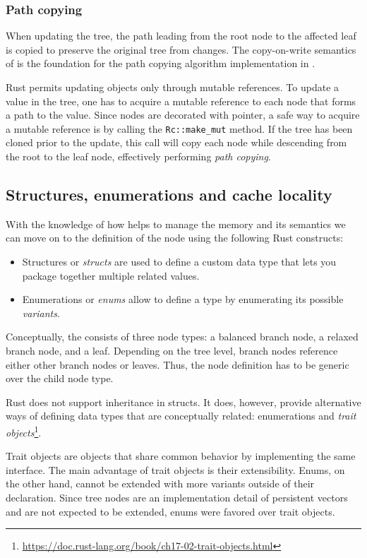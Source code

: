 \subsubsection*{Path copying}
When updating the tree, the path leading from the root node to the affected leaf is copied to preserve the original tree from changes. The copy-on-write semantics of \rc{} is the foundation for the path copying algorithm implementation in \rrbtree{}.

Rust permits updating objects only through mutable references. To update a value in the tree, one has to acquire a mutable reference to each node that forms a path to the value. Since nodes are decorated with \rc{} pointer, a safe way to acquire a mutable reference is by calling the \texttt{Rc::make_mut} method. If the tree has been cloned prior to the update, this call will copy each node while descending from the root to the leaf node, effectively performing \emph{path copying}.

\subsection{Structures, enumerations and cache locality}
With the knowledge of how \rc{} helps to manage the memory and its semantics we can move on to the definition of the \rrbtree{} node using the following Rust constructs:
\begin{itemize}
    \item Structures or \emph{structs} are used to define a custom data type that lets you package together multiple related values.
    \item Enumerations or \emph{enums} allow to define a type by enumerating its possible \emph{variants}.
\end{itemize}

Conceptually, the \rrbtree{} consists of three node types: a balanced branch node, a relaxed branch node, and a leaf. Depending on the tree level, branch nodes reference either other branch nodes or leaves. Thus, the node definition has to be generic over the child node type.

Rust does not support inheritance in structs. It does, however, provide alternative ways of defining data types that are conceptually related: enumerations and \emph{trait objects}\footnote{\url{https://doc.rust-lang.org/book/ch17-02-trait-objects.html}}.

Trait objects are objects that share common behavior by implementing the same interface. The main advantage of trait objects is their extensibility. Enums, on the other hand, cannot be extended with more variants outside of their declaration. Since tree nodes are an implementation detail of persistent vectors and are not expected to be extended, enums were favored over trait objects.

